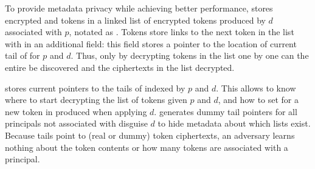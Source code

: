 To provide metadata privacy while achieving better performance, \sys stores encrypted  and
 tokens in a linked list of encrypted tokens produced by $d$ associated with $p$, notated
as . 
Tokens store links to the next token in the list with in an additional  field: this
field stores a pointer to the location of current tail of  for $p$ and $d$.
Thus, only by decrypting tokens in the list one by one can the entire  be discovered and
the ciphertexts in the list decrypted.

\sys stores current pointers to the tails of  indexed by $p$ and $d$. This allows \sys to
know where to start decrypting the list of tokens given $p$ and $d$, and how to set
 for a new token in  produced when applying $d$. \sys generates dummy
tail pointers for all principals not associated with disguise $d$ to hide metadata about which lists
exist.
Because  tails point to (real or dummy) token ciphertexts, an adversary learns nothing
about the token contents or how many tokens are associated with a principal.

\iffalse

\vspace{6pt}
\noindent\textbf{An Initial Strawman.}
As a strawman design, \sys saves a public key \pubk{p} for every principal $p$, and 
encrypts each private token of $p$'s with \pubk{p}. 
\sys stores all tokens in a bag of ciphertexts.

When a session client wants to access $p$'s tokens, \sys sends the client the bag of ciphertexts and
the client tries to decrypt all ciphertexts with its private key \privk{p}.
The client then sends \sys the tokens it could decrypt.

\vspace{6pt}
\noindent\textbf{A Better Strawman.}
Clearly, the initial strawman achieves both security goals but is impractical.

\fi

